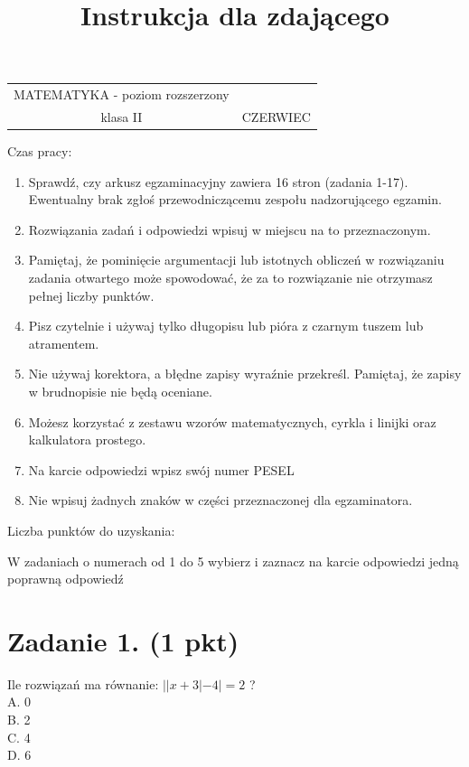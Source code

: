 \documentclass[10pt]{article}
\title{Instrukcja dla zdającego }
\author{}
\date{}
\begin{document}
\maketitle
\begin{center}
\begin{tabular}{|c|c}
\hline
MATEMATYKA - poziom rozszerzony &  \\
klasa II & CZERWIEC \\
\hline
\end{tabular}
\end{center}

Czas pracy:

\begin{enumerate}
  \item Sprawdź, czy arkusz egzaminacyjny zawiera 16 stron (zadania 1-17). Ewentualny brak zgłoś przewodniczącemu zespołu nadzorującego egzamin.
  \item Rozwiązania zadań i odpowiedzi wpisuj w miejscu na to przeznaczonym.
  \item Pamiętaj, że pominięcie argumentacji lub istotnych obliczeń w rozwiązaniu zadania otwartego może spowodować, że za to rozwiązanie nie otrzymasz pełnej liczby punktów.
  \item Pisz czytelnie i używaj tylko długopisu lub pióra z czarnym tuszem lub atramentem.
  \item Nie używaj korektora, a błędne zapisy wyraźnie przekreśl. Pamiętaj, że zapisy w brudnopisie nie będą oceniane.
  \item Możesz korzystać z zestawu wzorów matematycznych, cyrkla i linijki oraz kalkulatora prostego.
  \item Na karcie odpowiedzi wpisz swój numer PESEL
  \item Nie wpisuj żadnych znaków w części przeznaczonej dla egzaminatora.
\end{enumerate}

Liczba punktów do uzyskania:

W zadaniach o numerach od 1 do 5 wybierz i zaznacz na karcie odpowiedzi jedną poprawną odpowiedź

\section*{Zadanie 1. (1 pkt)}
Ile rozwiązań ma równanie: \(||x+3|-4|=2\) ?\\
A. 0\\
B. 2\\
C. 4\\
D. 6
\end{document}
